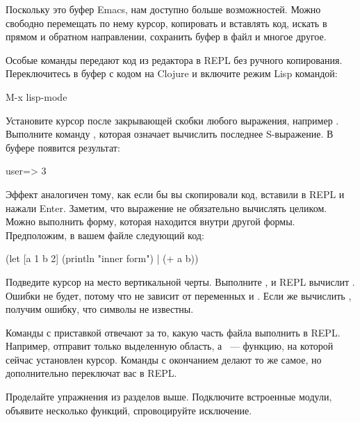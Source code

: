 Поскольку это буфер Emacs, нам доступно больше возможностей. Можно свободно перемещать по нему курсор, копировать и вставлять код, искать в прямом и обратном направлении, сохранить буфер в файл и многое другое.

Особые команды передают код из редактора в REPL без ручного копирования. Переключитесь в буфер с кодом на Clojure и включите режим Lisp командой:

\begin{english}
  \begin{text}
M-x lisp-mode
  \end{text}
\end{english}

Установите курсор после закрывающей скобки любого выражения, например . Выполните команду , которая означает вычислить последнее S-выражение. В буфере  появится результат:

\begin{english}
  \begin{text}
user=> 3
  \end{text}
\end{english}

Эффект аналогичен тому, как если бы вы скопировали код, вставили в REPL и нажали Enter. Заметим, что выражение не обязательно вычислять целиком. Можно выполнить форму, которая находится внутри другой формы. Предположим, в вашем файле следующий код:

\begin{english}
  \begin{clojure}
(let [a 1 b 2]
  (println "inner form") |
  (+ a b))
  \end{clojure}
\end{english}

Подведите курсор на место вертикальной черты. Выполните , и REPL вычислит . Ошибки не будет, потому что  не зависит от переменных  и . Если же вычислить , получим ошибку, что символы не известны.

Команды с приставкой  отвечают за то, какую часть файла выполнить в REPL. Например,  отправит только выделенную область, а ~--- функцию, на которой сейчас установлен курсор. Команды с окончанием  делают то же самое, но дополнительно переключат вас в REPL.

Проделайте упражнения из разделов выше. Подключите встроенные модули, объявите несколько функций, спровоцируйте исключение.

